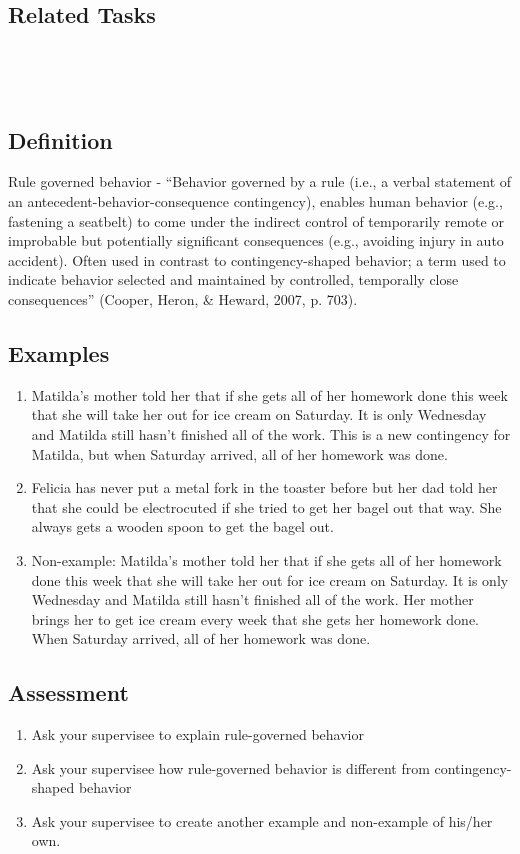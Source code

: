 \subsection{Related Tasks}
\foureFour{}\\
\fourFKFourtyTwo{}\\
%
%
%
%
%
%
\section{\fourFKFourtyTwo{}}
\subsection{Definition} 
Rule governed behavior - ``Behavior governed by a rule (i.e., a verbal statement of an antecedent-behavior-consequence contingency), enables human behavior (e.g., fastening a seatbelt) to come under the indirect control of temporarily remote or improbable but potentially significant consequences (e.g., avoiding injury in auto accident). Often used in contrast to contingency-shaped behavior; a term used to indicate behavior selected and maintained by controlled, temporally close consequences'' (Cooper, Heron, \& Heward, 2007, p. 703).
%
\subsection{Examples}
\begin{enumerate}
\item Matilda's mother told her that if she gets all of her homework done this week that she will take her out for ice cream on Saturday. It is only Wednesday and Matilda still hasn't finished all of the work. This is a new contingency for Matilda, but when Saturday arrived, all of her homework was done.
\item Felicia has never put a metal fork in the toaster before but her dad told her that she could be electrocuted if she tried to get her bagel out that way. She always gets a wooden spoon to get the bagel out.
\item Non-example: Matilda's mother told her that if she gets all of her homework done this week that she will take her out for ice cream on Saturday. It is only Wednesday and Matilda still hasn't finished all of the work. Her mother brings her to get ice cream every week that she gets her homework done. When Saturday arrived, all of her homework was done.
%
\end{enumerate}
%
\subsection{Assessment}
\begin{enumerate}
\item Ask your supervisee to explain rule-governed behavior 
\item Ask your supervisee how rule-governed behavior is different from contingency-shaped behavior
\item Ask your supervisee to create another example and non-example of his/her own.  
\end{enumerate}
%
